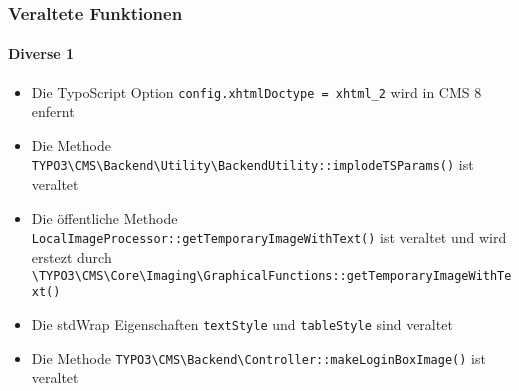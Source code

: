 \begin{frame}[fragile]
	\frametitle{Veraltete Funktionen}
	\framesubtitle{Diverse 1}

	\begin{itemize}
		\item Die TypoScript Option \texttt{config.xhtmlDoctype = xhtml\_2} wird in CMS 8 enfernt

		\item Die Methode \lstinline{TYPO3\CMS\Backend\Utility\BackendUtility::implodeTSParams()} ist veraltet

		\item Die öffentliche Methode \texttt{LocalImageProcessor::getTemporaryImageWithText()} ist veraltet und wird erstezt durch \lstinline{\TYPO3\CMS\Core\Imaging\GraphicalFunctions::getTemporaryImageWithText()}

		\item Die stdWrap Eigenschaften \texttt{textStyle} und \texttt{tableStyle} sind veraltet

		\item Die Methode \lstinline{TYPO3\CMS\Backend\Controller::makeLoginBoxImage()} ist veraltet
	\end{itemize}

\end{frame}


